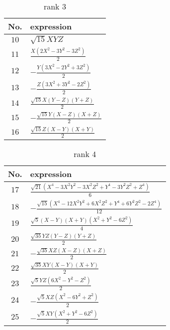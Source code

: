 \documentclass[fleqn,8pt,landscape]{jsarticle}
\begin{document}
\begin{table}[ht!]
\begin{center}
\caption{rank 3}
\renewcommand{\arraystretch}{1.3}
\begin{tabular}{cl} \hline \hline
No. & expression \\ \hline
$ 10 $ & $ \sqrt{15} X Y Z $ \\
$ 11 $ & $ \frac{X \left(2 X^{2} - 3 Y^{2} - 3 Z^{2}\right)}{2} $ \\
$ 12 $ & $ - \frac{Y \left(3 X^{2} - 2 Y^{2} + 3 Z^{2}\right)}{2} $ \\
$ 13 $ & $ - \frac{Z \left(3 X^{2} + 3 Y^{2} - 2 Z^{2}\right)}{2} $ \\
$ 14 $ & $ \frac{\sqrt{15} X \left(Y - Z\right) \left(Y + Z\right)}{2} $ \\
$ 15 $ & $ - \frac{\sqrt{15} Y \left(X - Z\right) \left(X + Z\right)}{2} $ \\
$ 16 $ & $ \frac{\sqrt{15} Z \left(X - Y\right) \left(X + Y\right)}{2} $ \\
 \hline \hline
\end{tabular}
\end{center}
\end{table}
\begin{table}[ht!]
\begin{center}
\caption{rank 4}
\renewcommand{\arraystretch}{1.3}
\begin{tabular}{cl} \hline \hline
No. & expression \\ \hline
$ 17 $ & $ \frac{\sqrt{21} \left(X^{4} - 3 X^{2} Y^{2} - 3 X^{2} Z^{2} + Y^{4} - 3 Y^{2} Z^{2} + Z^{4}\right)}{6} $ \\
$ 18 $ & $ - \frac{\sqrt{15} \left(X^{4} - 12 X^{2} Y^{2} + 6 X^{2} Z^{2} + Y^{4} + 6 Y^{2} Z^{2} - 2 Z^{4}\right)}{12} $ \\
$ 19 $ & $ \frac{\sqrt{5} \left(X - Y\right) \left(X + Y\right) \left(X^{2} + Y^{2} - 6 Z^{2}\right)}{4} $ \\
$ 20 $ & $ \frac{\sqrt{35} Y Z \left(Y - Z\right) \left(Y + Z\right)}{2} $ \\
$ 21 $ & $ - \frac{\sqrt{35} X Z \left(X - Z\right) \left(X + Z\right)}{2} $ \\
$ 22 $ & $ \frac{\sqrt{35} X Y \left(X - Y\right) \left(X + Y\right)}{2} $ \\
$ 23 $ & $ \frac{\sqrt{5} Y Z \left(6 X^{2} - Y^{2} - Z^{2}\right)}{2} $ \\
$ 24 $ & $ - \frac{\sqrt{5} X Z \left(X^{2} - 6 Y^{2} + Z^{2}\right)}{2} $ \\
$ 25 $ & $ - \frac{\sqrt{5} X Y \left(X^{2} + Y^{2} - 6 Z^{2}\right)}{2} $ \\
 \hline \hline
\end{tabular}
\end{center}
\end{table}
\end{document}
